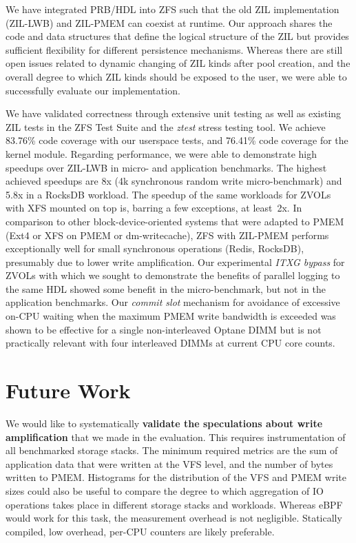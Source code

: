 \documentclass[12pt,a4paper,twoside]{book}
\begin{document}
We have integrated PRB/HDL into ZFS such that the old ZIL implementation (ZIL-LWB) and ZIL-PMEM can coexist at runtime.
Our approach shares the code and data structures that define the logical structure of the ZIL but provides sufficient flexibility for different persistence mechanisms.
Whereas there are still open issues related to dynamic changing of ZIL kinds after pool creation, and the overall degree to which ZIL kinds should be exposed to the user, we were able to successfully evaluate our implementation.

We have validated correctness through extensive unit testing as well as existing ZIL tests in the ZFS Test Suite and the \textit{ztest} stress testing tool.
We achieve 83.76\% code coverage with our userspace tests, and 76.41\% code coverage for the kernel module.
Regarding performance, we were able to demonstrate high speedups over ZIL-LWB in micro- and application benchmarks.
The highest achieved speedups are 8x (4k synchronous random write micro-benchmark) and 5.8x in a RocksDB workload.
The speedup of the same workloads for ZVOLs with XFS mounted on top is, barring a few exceptions, at least~2x.
In comparison to other block-device-oriented systems that were adapted to PMEM (Ext4 or XFS on PMEM or dm-writecache), ZFS with ZIL-PMEM performs exceptionally well for small synchronous operations (Redis, RocksDB), presumably due to lower write amplification.
Our experimental \textit{ITXG bypass} for ZVOLs with which we sought to demonstrate the benefits of parallel logging to the same HDL showed some benefit in the micro-benchmark, but not in the application benchmarks.
Our \textit{commit slot} mechanism for avoidance of excessive on-CPU waiting when the maximum PMEM write bandwidth is exceeded was shown to be effective for a single non-interleaved Optane DIMM but is not practically relevant with four interleaved DIMMs at current CPU core counts.

\section{Future Work}\label{sec:futurework}

We would like to systematically \textbf{validate the speculations about write amplification} that we made in the evaluation.
This requires instrumentation of all benchmarked storage stacks.
The minimum required metrics are the sum of application data that were written at the VFS level, and the number of bytes written to PMEM.
Histograms for the distribution of the VFS and PMEM write sizes could also be useful to compare the degree to which aggregation of IO operations takes place in different storage stacks and workloads.
Whereas eBPF would work for this task, the measurement overhead is not negligible.
Statically compiled, low overhead, per-CPU counters are likely preferable.
\end{document}
